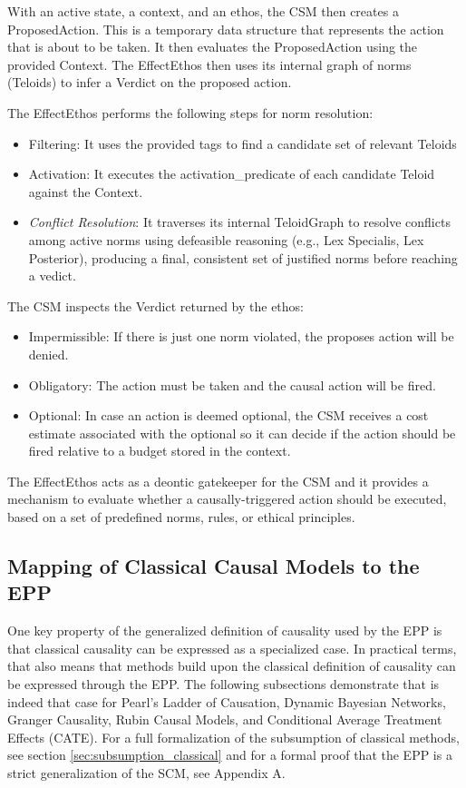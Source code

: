 With an active state, a context, and an ethos, the CSM then creates a ProposedAction. This is a temporary data structure that represents the action that is about to be taken. It then evaluates the ProposedAction using the provided Context. The EffectEthos then uses its internal graph of norms (Teloids) to infer a Verdict on the proposed action.

The EffectEthos performs the following steps for norm resolution:
    \begin{itemize}
        \item Filtering: It uses the provided tags to find a candidate set of relevant Teloids 
        \item Activation: It executes the activation\_predicate of each candidate Teloid against the Context.
        \item \textit{Conflict Resolution}: It traverses its internal TeloidGraph to resolve conflicts among active norms using defeasible reasoning (e.g., Lex Specialis, Lex Posterior), producing a final, consistent set of justified norms before reaching a vedict.
    \end{itemize}

The CSM inspects the Verdict returned by the ethos:
\begin{itemize}
	\item Impermissible: If there is just one norm violated, the proposes action will be denied. 
	\item Obligatory: The action must be taken and the causal action will be fired.
	\item Optional: In case an action is deemed optional, the CSM receives a cost estimate associated with the optional so it can decide if the action should be fired relative to a budget stored in the context.   
\end{itemize}

The EffectEthos acts as a deontic  gatekeeper for the CSM and it provides a mechanism to evaluate whether a causally-triggered action should be executed, based on a set of predefined norms, rules, or ethical principles. 

\newpage

\subsection{Mapping of Classical Causal Models to the EPP}
\label{sec:epp_subsumption_classical}

One key property of the generalized definition of causality used by the EPP
is that classical causality can be expressed as a specialized case. In
practical terms, that also means that methods build upon the classical definition
of causality can be expressed through the EPP. The following subsections demonstrate
that is indeed that case for Pearl's Ladder of Causation, Dynamic Bayesian Networks,
Granger Causality, Rubin Causal Models, and Conditional Average Treatment Effects (CATE).
For a full formalization of the subsumption of classical methods, see section \ref{sec:subsumption_classical}
and for a formal proof that the EPP is a strict generalization of the SCM, see Appendix A. 

